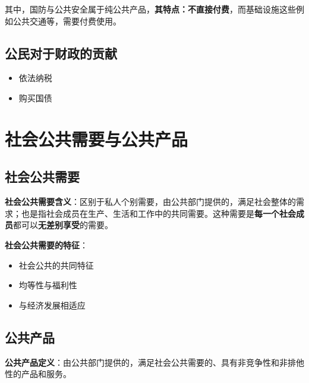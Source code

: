 \documentclass[
]{book}
\providecommand{\tightlist}{%
  \setlength{\itemsep}{0pt}\setlength{\parskip}{0pt}}
\begin{document}
其中，国防与公共安全属于纯公共产品，\textbf{其特点：不直接付费}，而基础设施这些例如公共交通等，需要付费使用。

\hypertarget{ux516cux6c11ux5bf9ux4e8eux8d22ux653fux7684ux8d21ux732e}{%
\subsection{公民对于财政的贡献}\label{ux516cux6c11ux5bf9ux4e8eux8d22ux653fux7684ux8d21ux732e}}

\begin{itemize}
\tightlist
\item
  依法纳税
\item
  购买国债
\end{itemize}

\hypertarget{ux793eux4f1aux516cux5171ux9700ux8981ux4e0eux516cux5171ux4ea7ux54c1}{%
\section{社会公共需要与公共产品}\label{ux793eux4f1aux516cux5171ux9700ux8981ux4e0eux516cux5171ux4ea7ux54c1}}

\hypertarget{ux793eux4f1aux516cux5171ux9700ux8981}{%
\subsection{社会公共需要}\label{ux793eux4f1aux516cux5171ux9700ux8981}}

\textbf{社会公共需要含义}：区别于私人个别需要，由公共部门提供的，满足社会整体的需求；也是指社会成员在生产、生活和工作中的共同需要。这种需要是\textbf{每一个社会成员}都可以\textbf{无差别享受}的需要。

\textbf{社会公共需要的特征}：

\begin{itemize}
\tightlist
\item
  社会公共的共同特征
\item
  均等性与福利性
\item
  与经济发展相适应
\end{itemize}

\hypertarget{ux516cux5171ux4ea7ux54c1}{%
\subsection{公共产品}\label{ux516cux5171ux4ea7ux54c1}}

\textbf{公共产品定义}：由公共部门提供的，满足社会公共需要的、具有非竞争性和非排他性的产品和服务。
\end{document}
